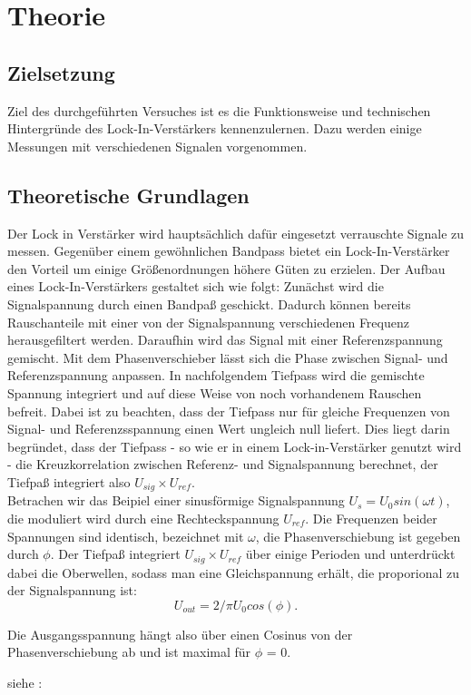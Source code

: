 \section{Theorie}
\label{sec:Theorie}
\subsection{Zielsetzung}
\label{sec:Zielsetzung}
Ziel des durchgeführten Versuches ist es die Funktionsweise und technischen
Hintergründe des Lock-In-Verstärkers kennenzulernen. Dazu werden einige
Messungen mit verschiedenen Signalen vorgenommen.

\subsection{Theoretische Grundlagen}
\label{sec:Grundlagen}
Der Lock in Verstärker wird hauptsächlich dafür eingesetzt verrauschte Signale
zu messen. Gegenüber einem gewöhnlichen Bandpass bietet ein Lock-In-Verstärker
den Vorteil um einige Größenordnungen höhere Güten zu erzielen.
Der Aufbau eines Lock-In-Verstärkers gestaltet sich wie folgt:
Zunächst wird die Signalspannung durch einen Bandpaß geschickt. Dadurch
können bereits Rauschanteile mit einer von der Signalspannung verschiedenen
Frequenz herausgefiltert werden.
Daraufhin wird das Signal mit einer Referenzspannung gemischt. Mit dem
Phasenverschieber lässt sich die Phase zwischen Signal- und Referenzspannung
anpassen.
In nachfolgendem Tiefpass wird die gemischte Spannung integriert und auf diese
Weise von noch vorhandenem Rauschen befreit. Dabei ist zu beachten, dass der
Tiefpass nur für gleiche Frequenzen von Signal- und Referenzsspannung
einen Wert ungleich null liefert. Dies liegt
darin begründet, dass der Tiefpass - so wie er in einem Lock-in-Verstärker
genutzt wird - die Kreuzkorrelation zwischen Referenz- und Signalspannung
berechnet, der Tiefpaß integriert also $U_{sig} \times U_{ref}$.\\

Betrachen wir das Beipiel einer sinusförmige Signalspannung $U_s = U_0 sin(\omega
t)$, die moduliert wird durch eine Rechteckspannung $U_{ref}$. Die Frequenzen
beider Spannungen sind identisch, bezeichnet mit $\omega$,
die Phasenverschiebung ist gegeben durch $\phi$.
Der Tiefpaß integriert $U_{sig} \times U_{ref}$ über einige Perioden und
unterdrückt dabei die Oberwellen, sodass man eine Gleichspannung erhält, die
proporional zu der Signalspannung ist:
\begin{equation}
U_{out} = 2/\pi U_0cos(\phi).
\label{eqn:Uout}
\end{equation}



Die Ausgangsspannung hängt also über einen Cosinus
von der Phasenverschiebung ab und ist maximal
für $\phi$ = 0.

siehe : \cite[1-3]{Anleitung}
